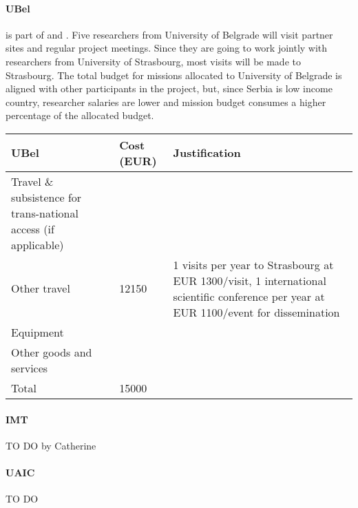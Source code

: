 \paragraph*{UBel}
is part of  and . 
Five researchers from University of Belgrade will visit partner sites
and regular project meetings. Since they are going to work jointly
with researchers from University of Strasbourg, most visits will be
made to Strasbourg. The total budget for missions allocated to
University of Belgrade is aligned with other participants in the
project, but, since Serbia is low income country, researcher salaries
are lower and mission budget consumes a higher percentage of the
allocated budget.

\begin{center}
\begin{tabular}{|p{9em}|l|p{}|}
\hline
  UBel & Cost (EUR)  & Justification \\
  \hline
  Travel \& subsistence for trans-national access (if applicable) & & \\
  \hline
  Other travel & 12150 & 1 visits per year to Strasbourg at EUR 1300/visit,
  1 international scientific conference per year at EUR 1100/event for
  dissemination \\
  \hline
  Equipment & & \\
  \hline
  Other goods and services & & \\
  \hline
  \hline
  Total & 15000 & \\
  \hline
\end{tabular}
\end{center}

\paragraph*{IMT}

{\color{red} TO DO by Catherine}

\paragraph*{UAIC}

{\color{red} TO DO}




